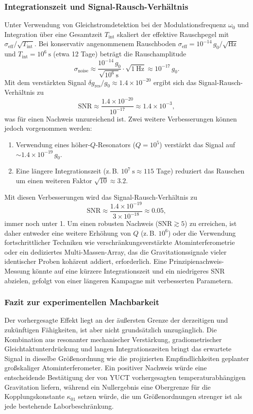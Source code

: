 \documentclass[12pt]{article}
\theoremstyle{remark}
\begin{document}
	\subsubsection{Integrationszeit und Signal-Rausch-Verhältnis}
	Unter Verwendung von Gleichstromdetektion bei der Modulationsfrequenz \(\omega_0\) und Integration über eine Gesamtzeit \(T_{\mathrm{int}}\) skaliert der effektive Rauschpegel mit \(\sigma_{\mathrm{eff}} / \sqrt{T_{\mathrm{int}}}\). Bei konservativ angenommenem Rauschboden \(\sigma_{\mathrm{eff}} = 10^{-14}\,g_0/\sqrt{\mathrm{Hz}}\) und \(T_{\mathrm{int}} = 10^6\ \mathrm{s}\) (etwa 12 Tage) beträgt die Rauschamplitude
	\[
	\sigma_{\mathrm{noise}} \approx \frac{10^{-14}\,g_0}{\sqrt{10^6\ \mathrm{s}}} \cdot \sqrt{1\ \mathrm{Hz}} \approx 10^{-17}\,g_0.
	\]
	Mit dem verstärkten Signal \(\delta g_{\mathrm{res}}/g_0 \approx 1.4\times10^{-20}\) ergibt sich das Signal-Rausch-Verhältnis zu
	\[
	\mathrm{SNR} \approx \frac{1.4\times10^{-20}}{10^{-17}} \approx 1.4\times10^{-3},
	\]
	was für einen Nachweis unzureichend ist. Zwei weitere Verbesserungen können jedoch vorgenommen werden:
	\begin{enumerate}
		\item Verwendung eines höher-\(Q\)-Resonators (\(Q = 10^5\)) verstärkt das Signal auf \(\sim 1.4\times10^{-19}\,g_0\).
		\item Eine längere Integrationszeit (z. B. \(10^7\ \mathrm{s} \approx 115\) Tage) reduziert das Rauschen um einen weiteren Faktor \(\sqrt{10} \approx 3.2\).
	\end{enumerate}
	Mit diesen Verbesserungen wird das Signal-Rausch-Verhältnis zu
	\[
	\mathrm{SNR} \approx \frac{1.4\times10^{-19}}{3\times10^{-18}} \approx 0.05,
	\]
	immer noch unter 1. Um einen robusten Nachweis (\(\mathrm{SNR} \gtrsim 5\)) zu erreichen, ist daher entweder eine weitere Erhöhung von \(Q\) (z. B. \(10^6\)) oder die Verwendung fortschrittlicher Techniken wie verschränkungsverstärkte Atominterferometrie oder ein dediziertes Multi-Massen-Array, das die Gravitationssignale vieler identischer Proben kohärent addiert, erforderlich. Eine Prinzipienachweis-Messung könnte auf eine kürzere Integrationszeit und ein niedrigeres SNR abzielen, gefolgt von einer längeren Kampagne mit verbesserten Parametern.
	
	\subsubsection{Fazit zur experimentellen Machbarkeit}
	Der vorhergesagte Effekt liegt an der äußersten Grenze der derzeitigen und zukünftigen Fähigkeiten, ist aber nicht grundsätzlich unzugänglich. Die Kombination aus resonanter mechanischer Verstärkung, gradiometrischer Gleichtaktunterdrückung und langen Integrationszeiten bringt das erwartete Signal in dieselbe Größenordnung wie die projizierten Empfindlichkeiten geplanter großskaliger Atominterferometer. Ein positiver Nachweis würde eine entscheidende Bestätigung der von YUCT vorhergesagten temperaturabhängigen Gravitation liefern, während ein Nullergebnis eine Obergrenze für die Kopplungskonstante \(\kappa_{01}\) setzen würde, die um Größenordnungen strenger ist als jede bestehende Laborbeschränkung.
	
\end{document}
